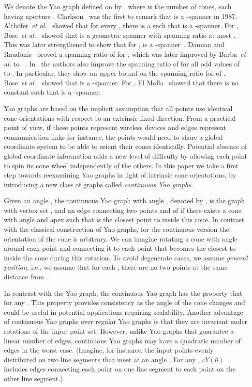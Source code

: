 \documentclass{cccg14}
\newcommand{\etal}{\emph{et al.}\xspace}
\newcommand{\cyao}{\ensuremath{cY(\theta)}\xspace}
\begin{document}
We denote the Yao graph defined on  by , where  is the number of cones, each having aperture .
Clarkson~\cite{clarkson1987approximation} was the first to remark that  is a -spanner in 1987.
Alth{\"o}fer~\etal~\cite{althofer1993sparse} showed that for every , there is a  such that  is a -spanner. 
For , Bose~\etal~\cite{bose2004approximating} showed that  is a geometric spanner with spanning ratio at most . 
This was later strengthened to show that for ,  is a -spanner~\cite{bose2012piArxiv}. 
Damian and Raudonis~\cite{damian2012yao} proved a spanning ratio of  for , which was later improved by Barba~\etal to ~\cite{barba2014new}. In~\cite{barba2014new} the authors also improve the spanning ratio of  for all odd values of  to . In particular, they show an upper bound on the spanning ratio for  of .
Bose~\etal~\cite{bose2012pi} showed that  is a -spanner. For , El Molla~\cite{el2009yao} showed that there is no constant  such that  is a -spanner. 

Yao graphs are based on the implicit assumption that all points use identical cone orientations with respect to an extrinsic fixed direction. From a practical point of view, if these points represent wireless devices and edges represent communication links for instance, the points would need to share a global coordinate system to be able to orient their cones identically. Potential absence of global coordinate information adds a new level of difficulty by allowing each point to spin its cone wheel independently of the others. In this paper we take a first step towards reexamining Yao graphs in light of intrinsic cone orientations, by introducing a new class of graphs called \emph{continuous Yao graphs}.

Given an angle , the continuous Yao graph with angle , denoted by , is the graph with vertex set , and an edge connecting two points  and  of  if there exists a cone with angle  and apex  such that  is the closest point to  inside this cone. In contrast with the classical construction of Yao graphs, for the continuous version the orientation of the cone is arbitrary. We can imagine rotating a cone with angle  around each point  and connecting it to each point that becomes the closest to  inside the cone during this rotation. To avoid degenerate cases, we assume \emph{general position}, i.e., we assume that for each , there are no two points at the same distance from .

In contrast with the Yao graph, the continuous Yao graph has the property that  for any . This property provides consistency as the angle of the cone changes and could be useful in potential applications requiring scalability. Another advantage of continuous Yao graphs over regular Yao graphs is that they are invariant under rotations of the input point set. However, unlike Yao graphs that guarantee a linear number of edges, continuous Yao graphs may have a quadratic number of edges in the worst case. (Imagine, for instance, the input points evenly distributed on two line segments that meet at an angle . For any , \cyao includes edges connecting each point on one line segment to each point on the other line segment.)
\end{document}

